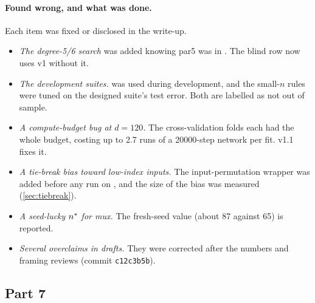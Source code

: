 \paragraph{Found wrong, and what was done.} Each item was fixed or disclosed in the write-up.
\begin{itemize}
\item \emph{The degree-5/6 search} was added knowing par5 was in . The blind row now uses v1 without it.
\item \emph{The development suites.}  was used during development, and the small-$n$ rules were tuned on the designed suite's test error. Both are labelled as not out of sample.
\item \emph{A compute-budget bug at $d=120$.} The cross-validation folds each had the whole budget, costing up to 2.7 runs of a 20000-step network per fit. v1.1 fixes it.
\item \emph{A tie-break bias toward low-index inputs.} The input-permutation wrapper was added before any run on , and the size of the bias was measured (\cref{sec:tiebreak}).
\item \emph{A seed-lucky $n^{*}$ for mux.} The fresh-seed value (about 87 against 65) is reported.
\item \emph{Several overclaims in drafts.} They were corrected after the numbers and framing reviews (commit \texttt{c12c3b5b}).
\end{itemize}

\subsection{Part 7}

